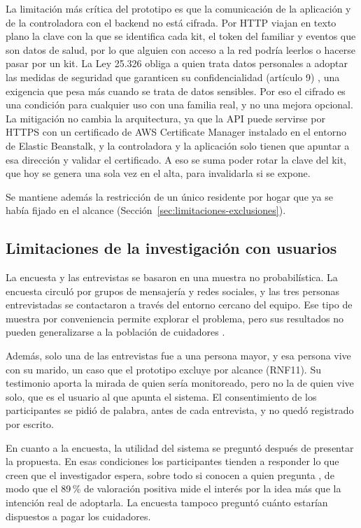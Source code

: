 La limitación más crítica del prototipo es que la comunicación de la aplicación y de la controladora con el backend no está cifrada.
Por HTTP viajan en texto plano la clave con la que se identifica cada kit, el token del familiar y eventos que son datos de salud, por lo que alguien con acceso a la red podría leerlos o hacerse pasar por un kit.
La Ley 25.326 obliga a quien trata datos personales a adoptar las medidas de seguridad que garanticen su confidencialidad (artículo 9) \parencite{Argentina2000}, una exigencia que pesa más cuando se trata de datos sensibles.
Por eso el cifrado es una condición para cualquier uso con una familia real, y no una mejora opcional.
La mitigación no cambia la arquitectura, ya que la API puede servirse por HTTPS con un certificado de AWS Certificate Manager instalado en el entorno de Elastic Beanstalk, y la controladora y la aplicación solo tienen que apuntar a esa dirección y validar el certificado.
A eso se suma poder rotar la clave del kit, que hoy se genera una sola vez en el alta, para invalidarla si se expone.

Se mantiene además la restricción de un único residente por hogar que ya se había fijado en el alcance (Sección~\ref{sec:limitaciones-exclusiones}).

\subsection{Limitaciones de la investigación con usuarios}

La encuesta y las entrevistas se basaron en una muestra no probabilística.
La encuesta circuló por grupos de mensajería y redes sociales, y las tres personas entrevistadas se contactaron a través del entorno cercano del equipo.
Ese tipo de muestra por conveniencia permite explorar el problema, pero sus resultados no pueden generalizarse a la población de cuidadores \parencite{Etikan2016}.

Además, solo una de las entrevistas fue a una persona mayor, y esa persona vive con su marido, un caso que el prototipo excluye por alcance (RNF11).
Su testimonio aporta la mirada de quien sería monitoreado, pero no la de quien vive solo, que es el usuario al que apunta el sistema.
El consentimiento de los participantes se pidió de palabra, antes de cada entrevista, y no quedó registrado por escrito.

En cuanto a la encuesta, la utilidad del sistema se preguntó después de presentar la propuesta.
En esas condiciones los participantes tienden a responder lo que creen que el investigador espera, sobre todo si conocen a quien pregunta \parencite{Dell2012}, de modo que el 89\,\% de valoración positiva mide el interés por la idea más que la intención real de adoptarla.
La encuesta tampoco preguntó cuánto estarían dispuestos a pagar los cuidadores.

